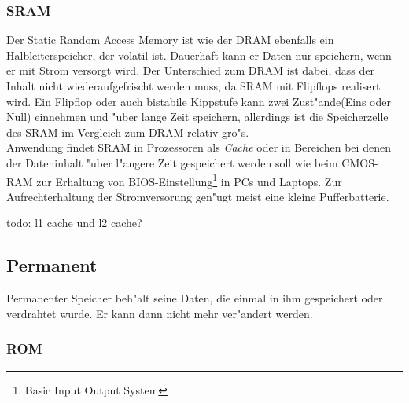 				\subsubsection{SRAM}
				\label{ch:Technisch:sec:Elektronische Speicherung:sub:Fl"uchtig:subsub:SRAM}
				
					Der \glqq Static Random Access Memory\grqq{} ist wie der DRAM ebenfalls ein Halbleiterspeicher, der volatil ist. Dauerhaft kann er Daten nur speichern, wenn er mit Strom versorgt wird. Der Unterschied zum DRAM ist dabei, dass der Inhalt nicht wiederaufgefrischt werden muss, da SRAM mit Flipflops realisert wird. Ein Flipflop oder auch bistabile Kippstufe kann zwei Zust"ande(Eins oder Null) einnehmen und "uber lange Zeit speichern, allerdings ist die Speicherzelle des SRAM im Vergleich zum DRAM relativ gro"s.
					\\
					Anwendung findet SRAM in Prozessoren als \textit{Cache} oder in Bereichen bei denen der Dateninhalt "uber l"angere Zeit gespeichert werden soll wie beim CMOS-RAM zur Erhaltung von BIOS-Einstellung\footnote[5]{Basic Input Output System} in PCs und Laptops. Zur Aufrechterhaltung der Stromversorung gen"ugt meist eine kleine Pufferbatterie.
					
					todo: l1 cache und l2 cache?
        
        \subsection{Permanent}
        \label{ch:Technisch:sec:Elektronische Speicherung:sub:Permanent}
        
            Permanenter Speicher beh"alt seine Daten, die einmal in ihm gespeichert oder verdrahtet wurde. Er kann dann nicht mehr ver"andert werden.
			
				\subsubsection{ROM}
				\label{ch:Technisch:sec:Elektronische Speicherung:sub:Fl"uchtig:subsub:ROM}
				
